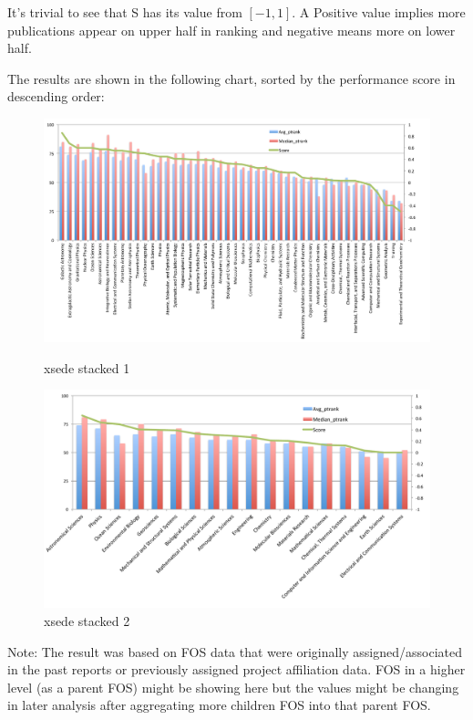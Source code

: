 \documentclass{sig-alternate}
\begin{document}
It's trivial to see that S has its value from $[-1, 1]$. A Positive
value implies more publications appear on upper half in ranking and
negative means more on lower half.

The results are shown in the following chart, sorted by the
performance score in descending order:


\begin{figure}[htb] 
  \centering 
    \includegraphics[width=1.0\textwidth]{images-new/a.pdf} 
  \caption{xsede stacked 1}\label{F:xsede-stacked} 

  \centering 
    \includegraphics[width=1.0\textwidth]{images-new/b.pdf} 
  \caption{xsede stacked 2}\label{F:xsede-stacked} 
\end{figure} 


Note: The result was based on FOS data that were originally
assigned/associated in the past reports or previously assigned project
affiliation data. FOS in a higher level (as a parent FOS) might be
showing here but the values might be changing in later analysis after
aggregating more children FOS into that parent FOS.
\end{document}
